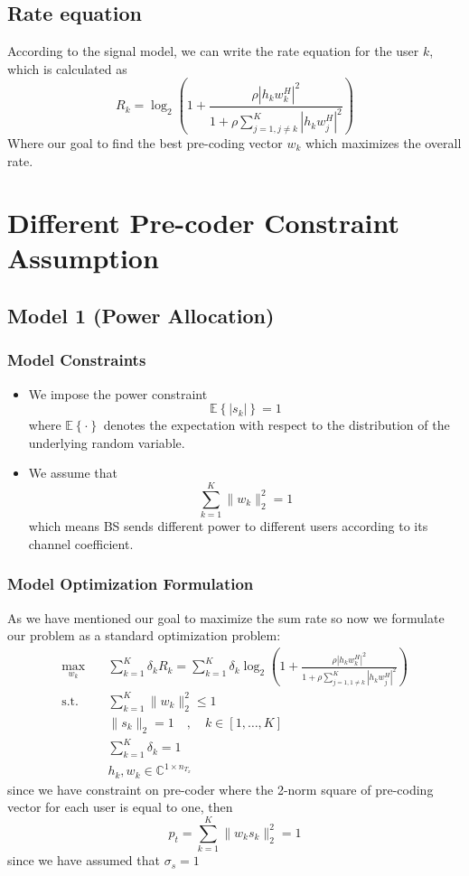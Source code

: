 \subsection{Rate equation}
According to the signal model, we can write the rate equation for the user $k$, which is calculated as
\begin{equation}
    R_k=\log_2\left(1+\frac{{\rho\left|h_k w_k^H\right|}^2}{1+\rho \sum_{j=1,j\neq k}^{K}{\left|h_k w_j^H\right|^2}}\right)
\end{equation}
Where our goal to find the best pre-coding vector $w_k$ which maximizes the overall rate.

\section{Different Pre-coder Constraint Assumption}
\subsection{Model 1 (Power Allocation)}
\subsubsection{Model Constraints}
\begin{itemize}
    \item We impose the power constraint \[\mathbb{E} \left\{ |s_k| \right\} = 1\] where $\mathbb{E}\left\{\cdot\right\}$ denotes the expectation with respect to the distribution of the underlying random variable.
    \item We assume that \[ \sum_{k=1}^{K}\|w_k\|^2_2 = 1\] which means BS sends different power to different users according to its channel coefficient.
\end{itemize}
\subsubsection{Model Optimization Formulation}
As we have mentioned our goal to maximize the sum rate so now we formulate our problem as a standard optimization problem:
\begin{equation}
    \label{eq:multi-user opt pa}
    \begin{aligned}
        \max_{w_k} \quad & \sum_{k=1}^{K} \delta_k  R_k = \sum_{k=1}^{K} \delta_k \log_2 \left( 1 + \frac{\rho | h_k w_k^H |^2}{1 + \rho \sum_{j=1, 1\neq k}^{K}| h_k w_j^H |^2} \right) \\
        \text{s.t.} \quad &  \sum_{k=1}^{K}\|w_k\|^2_2 \leq 1 \\
        & \|s_k\|_2 =1 \quad , \quad k \in [1, \ldots , K] \\
        & \sum_{k=1}^{K} \delta_k = 1 \\
        & h_k, w_k \in \mathbb{C}^{1 \times n_{T_x}}
    \end{aligned}
\end{equation}
since we have constraint on pre-coder where the 2-norm square of pre-coding vector for each user is equal to one, then \[ p_t = \sum_{k=1}^{K}\|w_k s_k\|^2_2 = 1 \] since we have assumed that $\sigma_s =1$

